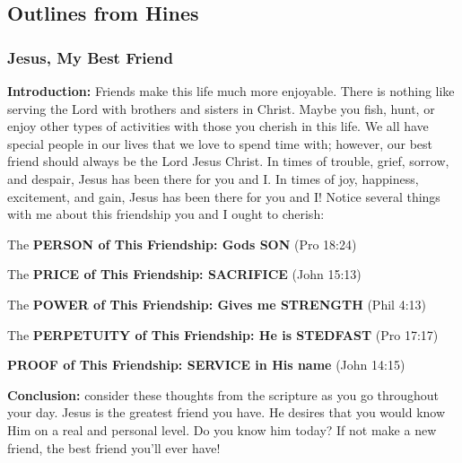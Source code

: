 \subsection{Outlines from Hines}

\subsubsection{Jesus, My Best Friend}


\noindent  \textbf{Introduction: } Friends make this life much more enjoyable. There is nothing like serving the Lord with brothers and sisters in Christ. Maybe you fish, hunt, or enjoy other types of activities with those you cherish in this life. We all have special people in our lives that we love to spend time with; however, our best friend should always be the Lord Jesus Christ. In times of trouble, grief, sorrow, and despair, Jesus has been there for you and I. In times of joy, happiness, excitement, and gain, Jesus has been there for you and I!
Notice several things with me about this friendship you and I ought to cherish:
\begin{compactenum}[I.]
    \item The \textbf{PERSON of This Friendship: Gods SON}  (Pro 18:24)
    \item The \textbf{PRICE of This Friendship: SACRIFICE}  (John 15:13)
    \item The \textbf{POWER of This Friendship: Gives me STRENGTH}  (Phil 4:13)
    \item The \textbf{PERPETUITY of This Friendship: He is STEDFAST}  (Pro 17:17)
    \item  \textbf{PROOF of This Friendship: SERVICE in His name}  (John 14:15)
    \end{compactenum}
\textbf{Conclusion: } consider these thoughts from the scripture as you go throughout your day. Jesus is the greatest friend you have. He desires that you would know Him on a real and personal level. Do you know him today? If not make a new friend, the best friend you'll ever have!


